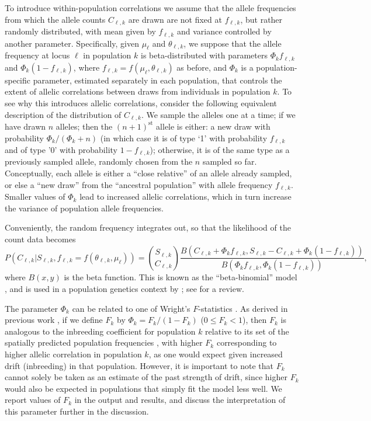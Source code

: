To introduce within-population correlations 
we assume that the allele frequencies from which the allele counts $C_{\ell,k}$ are drawn are not fixed at $f_{\ell,k}$,
but rather randomly distributed, with mean given by $f_{\ell,k}$ and variance controlled by another parameter.
Specifically, given $\mu_\ell$ and $\theta_{\ell,k}$, we suppose that the allele frequency at locus $\ell$ in population $k$ is beta-distributed 
with parameters $\Phi_k f_{\ell,k}$ and $\Phi_k (1-f_{\ell,k})$, where $f_{\ell,k}=f(\mu_\ell,\theta_{\ell,k})$ as before, and $\Phi_k$ is a population-specific parameter, estimated separately in each population, that controls the extent of allelic correlations between draws from individuals in population $k$.
To see why this introduces allelic correlations, consider the following equivalent description of the distribution of $C_{\ell,k}$.
We sample the alleles one at a time; 
if we have drawn $n$ alleles; then the $(n+1)^\mathrm{st}$ allele is either:
a new draw with probability $\Phi_k/(\Phi_k+n)$ (in which case it is of type `1' with probability $f_{\ell,k}$ and of type '0' with probability $1-f_{\ell,k}$);
otherwise, it is of the same type as a previously sampled allele, randomly chosen from the $n$ sampled so far.
Conceptually,
each allele is either a ``close relative'' of an allele already sampled, or else a ``new draw'' from the ``ancestral population'' with allele frequency $f_{\ell,k}$.
Smaller values of $\Phi_k$ lead to increased allelic correlations, which in turn increase the variance of population allele frequencies.

Conveniently, the random frequency integrates out, so that the likelihood of the count data becomes
\begin{equation}
  P(C_{\ell,k}|S_{\ell,k},f_{\ell,k} =f(\theta_{\ell,k},\mu_{\ell})) = \binom{S_{\ell,k}}{ C_{\ell,k}} \frac{ B( C_{\ell,k} + \Phi_{k}f_{\ell,k} , S_{\ell,k}-C_{\ell,k} + \Phi_{k}(1-f_{\ell,k}) )}{ B ( \Phi_{k}f_{\ell,k}  , \Phi_{k}(1-f_{\ell,k}) )},
\end{equation}
where $B(x,y)$ is the beta function. 
This is known as the ``beta-binomial'' model \citep{williams1975analysis},
and is used in a population genetics context by \citet{BaldingNichols1995,BaldingNichols1997}; see \citet{Balding2003} for a review.

The parameter $\Phi_k$ can be related to one of Wright's $F$-statistics \citep{Wright1943}.  
As derived in previous work \citep{BaldingNichols1995,BaldingNichols1997}, 
if we define $F_k$ by $\Phi_k=F_{k}/(1-F_{k})$ ($0 \leq F_k <1$), 
then $F_{k}$ is analogous to the inbreeding coefficient for population $k$ relative to its set of the spatially predicted population frequencies \citep{Cockerham1986, Balding2003},
with higher $F_{k}$ corresponding to higher allelic correlation in population $k$, as one would expect given increased drift (inbreeding) in that population.
However, it is important to note that $F_{k}$ cannot solely be taken as an estimate of the past strength of drift,
since higher $F_{k}$ would also be expected in populations that simply fit the model less well.
We report values of $F_k$ in the output and results, and discuss the interpretation of this parameter further in the discussion.

